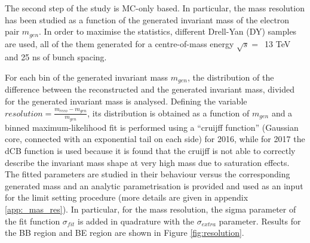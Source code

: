 The second step of the study is MC-only based.
In particular, the mass resolution has been studied as a function of the generated invariant mass of the electron pair $m_{gen}$.
In order to maximise the statistics, different Drell-Yan (DY) samples are used, all of the them generated for a centre-of-mass energy $\sqrt{s}=$~13 TeV and 25 ns of bunch spacing.

For each bin of the generated invariant mass $m_{gen}$, the distribution of the difference between the reconstructed and the generated invariant mass,
divided for the generated invariant mass is analysed.
Defining the variable $resolution =\frac{m_{reco}-m_{gen}}{m_{gen}}$, its distribution is obtained as a function of $m_{gen}$ and a binned maximum-likelihood
fit is performed using a ``cruijff function'' (Gaussian core, connected with an exponential tail on each side) for 2016, while for 2017 the dCB function is used because it is found that the cruijff is not able to correctly describe the invariant mass shape at very high mass due to saturation effects.
The fitted parameters are studied in their behaviour versus the corresponding generated mass and an analytic parametrisation is provided and used
as an input for the limit setting procedure (more details are given in appendix \ref{app:_mas_res}).
In particular, for the mass resolution, the sigma parameter of the fit function $\sigma_{fit}$ is added in quadrature with the $\sigma_{extra}$ parameter.
Results for the BB region and BE region are shown in Figure \ref{fig:resolution}.

